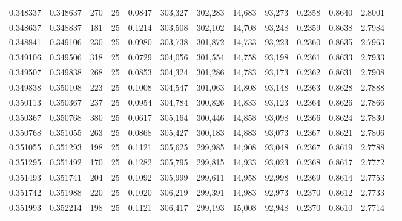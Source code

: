 \begin{tabular}{rrrrrrrrrrrrr}
0.348337 & 0.348637 &   270 &  25 &                                     0.0847 & 303,327 & 302,283 &  14,683 &  93,273 & 0.2358 & 0.8640 & 2.8001 \\
0.348637 & 0.348837 &   181 &  25 &                                     0.1214 & 303,508 & 302,102 &  14,708 &  93,248 & 0.2359 & 0.8638 & 2.7984 \\
0.348841 & 0.349106 &   230 &  25 &                                     0.0980 & 303,738 & 301,872 &  14,733 &  93,223 & 0.2360 & 0.8635 & 2.7963 \\
0.349106 & 0.349506 &   318 &  25 &                                     0.0729 & 304,056 & 301,554 &  14,758 &  93,198 & 0.2361 & 0.8633 & 2.7933 \\
0.349507 & 0.349838 &   268 &  25 &                                     0.0853 & 304,324 & 301,286 &  14,783 &  93,173 & 0.2362 & 0.8631 & 2.7908 \\
0.349838 & 0.350108 &   223 &  25 &                                     0.1008 & 304,547 & 301,063 &  14,808 &  93,148 & 0.2363 & 0.8628 & 2.7888 \\
0.350113 & 0.350367 &   237 &  25 &                                     0.0954 & 304,784 & 300,826 &  14,833 &  93,123 & 0.2364 & 0.8626 & 2.7866 \\
0.350367 & 0.350768 &   380 &  25 &                                     0.0617 & 305,164 & 300,446 &  14,858 &  93,098 & 0.2366 & 0.8624 & 2.7830 \\
0.350768 & 0.351055 &   263 &  25 &                                     0.0868 & 305,427 & 300,183 &  14,883 &  93,073 & 0.2367 & 0.8621 & 2.7806 \\
0.351055 & 0.351293 &   198 &  25 &                                     0.1121 & 305,625 & 299,985 &  14,908 &  93,048 & 0.2367 & 0.8619 & 2.7788 \\
0.351295 & 0.351492 &   170 &  25 &                                     0.1282 & 305,795 & 299,815 &  14,933 &  93,023 & 0.2368 & 0.8617 & 2.7772 \\
0.351493 & 0.351741 &   204 &  25 &                                     0.1092 & 305,999 & 299,611 &  14,958 &  92,998 & 0.2369 & 0.8614 & 2.7753 \\
0.351742 & 0.351988 &   220 &  25 &                                     0.1020 & 306,219 & 299,391 &  14,983 &  92,973 & 0.2370 & 0.8612 & 2.7733 \\
0.351993 & 0.352214 &   198 &  25 &                                     0.1121 & 306,417 & 299,193 &  15,008 &  92,948 & 0.2370 & 0.8610 & 2.7714 \\

\end{tabular}
